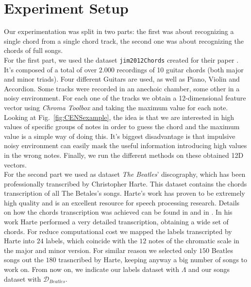 \section{Experiment Setup}
\label{sec:setup}

Our experimentation was split in two parts: the first was about recognizing a single chord from a single chord track, the second one was about recognizing the chords of full songs.\\
%
For the first part, we used the dataset \texttt{jim2012Chords} \cite{jim2012Chords} created for their paper \cite{JimChordsPaper}. It's composed of a total of over $2.000$ recordings of 10 guitar chords (both major and minor triads). Four different Guitars are used, as well as Piano, Violin and Accordion. Some tracks were recorded in an anechoic chamber, some other in a noisy environment. For each one of the tracks we obtain a 12-dimensional feature vector using \textit{Chroma Toolbox} and taking the maximum value for each note. Looking at Fig.~\ref{fig:CENSexample}, the idea is that we are interested in high values of specific groups of notes in order to guess the chord and the maximum value is a simple way of doing this. It's biggest disadvantage is that impulsive noisy environment can easily mask the useful information introducing high values in the wrong notes. Finally, we run the different methods on these obtained 12D vectors.\\
%
For the second part we used as dataset \textit{The Beatles}' discography, which has been professionally transcribed by Christopher Harte. This dataset contains the chords transcription of all The Betales's songs. Harte's work has proven to be extremely high quality and is an excellent resource for speech processing research. Details on how the chords transcription was achieved can be found in \cite{HartePaper} and in \cite{HarteThesis}. In his work Harte performed a very detailed transcription, obtaining a wide set of chords. For reduce computational cost we mapped the labels transcripted by Harte into $24$ labels, which coincide with the $12$ notes of the chromatic scale in the major and minor version. For similar reason we selected only $150$ Beatles songs out the $180$ trasncribed by Harte, keeping anyway a big number of songs to work on. From now on, we indicate our labels dataset with $\Lambda$ and our songs dataset with $\mathcal{D}_{Beatles}$. \\
%
